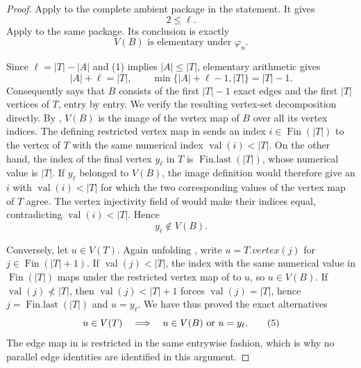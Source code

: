 \begin{proof}
Apply  to the complete
ambient package in the statement.  It gives
\[
                              2\leq\ell.                       \tag{1}
\]
Apply  to the same
package.  Its conclusion is exactly
\[
             V(B)\text{ is elementary under }\varphi_n.        \tag{2}
\]

Since $\ell=|T|-|A|$ and (1) implies $|A|\leq |T|$, elementary arithmetic
gives
\[
 |A|+\ell=|T|,
 \qquad
 \min\{|A|+\ell-1,|T|\}=|T|-1.                                \tag{3}
\]
Consequently  says that $B$ consists of the
first $|T|-1$ exact edges and the first $|T|$ vertices of $T$, entry by
entry.  We verify the resulting vertex-set decomposition directly.
By , $V(B)$ is the image of the vertex
map of $B$ over all its vertex indices.  The defining restricted vertex
map in  sends an index
$i\in\operatorname{Fin}(|T|)$ to the vertex of $T$ with the same
numerical index $\operatorname{val}(i)<|T|$.  On the other hand, the
index of the final vertex $y_\ell$ in $T$ is
$\operatorname{Fin.last}(|T|)$, whose numerical value is $|T|$.  If
$y_\ell$ belonged to $V(B)$, the image definition
would therefore give an $i$ with $\operatorname{val}(i)<|T|$ for which
the two corresponding values of the vertex map of $T$ agree.  The
vertex injectivity field of
 would make their indices equal, contradicting
$\operatorname{val}(i)<|T|$.  Hence
\[
                         y_\ell\notin V(B).                    \tag{4}
\]

Conversely, let $u\in V(T)$.  Again unfolding
, write $u=T.\mathit{vertex}(j)$ for
$j\in\operatorname{Fin}(|T|+1)$.  If $\operatorname{val}(j)<|T|$, the
index with the same numerical value in $\operatorname{Fin}(|T|)$ maps
under the restricted vertex map of  to $u$,
so $u\in V(B)$.  If
$\operatorname{val}(j)\not<|T|$, then
$\operatorname{val}(j)<|T|+1$ forces $\operatorname{val}(j)=|T|$, hence
$j=\operatorname{Fin.last}(|T|)$ and $u=y_\ell$.  We have thus proved
the exact alternatives
\[
 u\in V(T)\quad\Longrightarrow\quad
 u\in V(B)\ \hbox{or}\ u=y_\ell.                              \tag{5}
\]
The edge map in  is restricted in the same
entrywise fashion, which is why no parallel edge identities are
identified in this argument.


\end{proof}

